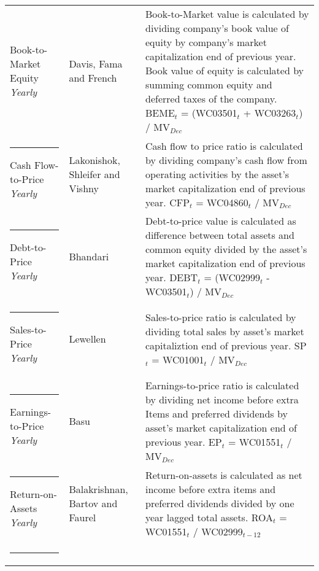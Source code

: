 \documentclass[12pt]{article}
\begin{document}
{{\begin{xltabular}{\textwidth}{ >{\raggedright\arraybackslash}p{0.23\textwidth} >{\raggedright\arraybackslash}p{0.2\textwidth} X}
Book-to-Market Equity \newline \emph{Yearly} 	& Davis, Fama and French \citeyearpar{Davis2000}	&  Book-to-Market value is calculated by dividing company's book value of equity by company's market capitalization end of previous year. Book value of equity is calculated by summing common equity and deferred taxes of the company. \newline BEME$_t$ = (WC03501$_{t}$ + WC03263$_{t}$) /  MV$_{Dec}$\\ \rule{-1ex}{3ex}
Cash Flow-to-Price \newline \emph{Yearly}	& Lakonishok, Shleifer and Vishny  \citeyearpar{Lakonishok1994} 	& Cash flow to price ratio is calculated by dividing company's cash flow from operating activities by the asset's market capitalization end of previous year. \newline CFP$_t$ = WC04860$_{t}$ / MV$_{Dec}$\\ \rule{-1ex}{3ex}
Debt-to-Price \newline \emph{Yearly}			& Bhandari \citeyearpar{Bhandari1988}				& Debt-to-price value is calculated as difference between total assets and common equity divided by the asset's market capitalization end of previous year. \newline DEBT$_t$ = (WC02999$_{t}$ - WC03501$_{t}$) / MV$_{Dec}$\\ \rule{-1ex}{3ex}
Sales-to-Price 	\newline \emph{Yearly}		& Lewellen \citeyearpar{Lewellen2015}				& Sales-to-price ratio is calculated by dividing total sales by asset's market capitaliztion end of previous year. \newline SP$_t$ = WC01001$_{t}$ / MV$_{Dec}$ \\ \rule{-1ex}{3ex}
Earnings-to-Price \newline \emph{Yearly}		& Basu \citeyearpar{Basu1977}					& Earnings-to-price ratio is calculated by dividing net income before extra Items and preferred dividends by asset's market capitalization end of previous year. \newline EP$_t$ = WC01551$_{t}$ / MV$_{Dec}$ \\ \rule{-1ex}{3ex}
Return-on-Assets \newline \emph{Yearly}		& Balakrishnan, Bartov and Faurel \citeyearpar{BALAKRISHNAN2010}	& Return-on-assets is calculated as net income before extra items and preferred dividends divided by one year lagged total assets. \newline ROA$_t$ = WC01551$_{t}$ / WC02999$_{t-12}$ \\ \rule{-1ex}{3ex}

\end{xltabular}}}
\end{document}
